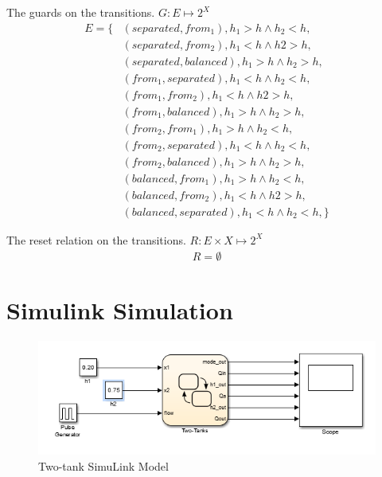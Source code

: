 \documentclass[letterpaper]{article}
\begin{document}
The guards on the transitions.
$G: E \mapsto 2^X$
\begin{align}
E = \{ 
  & ( separated, from_1 ), h_1 > h \wedge h_2 < h, \\
  & ( separated, from_2 ), h_1 < h \wedge h2 > h, \\
  & ( separated, balanced ), h_1 > h \wedge h_2 > h, \\
  & ( from_1, separated ), h_1 < h \wedge h_2 < h, \\
  & ( from_1, from_2 ), h_1 < h \wedge h2 > h, \\
  & ( from_1, balanced ), h_1 > h \wedge h_2 > h,  \\
  & ( from_2, from_1 ), h_1 > h \wedge h_2 < h, \\
  & ( from_2, separated ), h_1 < h \wedge h_2 < h, \\
  & ( from_2, balanced ), h_1 > h \wedge h_2 > h,  \\
  & ( balanced, from_1 ), h_1 > h \wedge h_2 < h, \\
  & ( balanced, from_2 ), h_1 < h \wedge h2 > h, \\
  & ( balanced, separated ), h_1 < h \wedge h_2 < h,  \}
\end{align}

The reset relation on the transitions.
$R: E \times X \mapsto 2^X$
\begin{align}
R = \emptyset 
\end{align}

\section{Simulink Simulation}

\begin{figure}[h!]
\centering
\includegraphics[scale=0.7]{hw8_two_tanks_simulink.png}
\caption{Two-tank SimuLink Model}
\label{fig:two-tank-simulink}
\end{figure}
\end{document}
